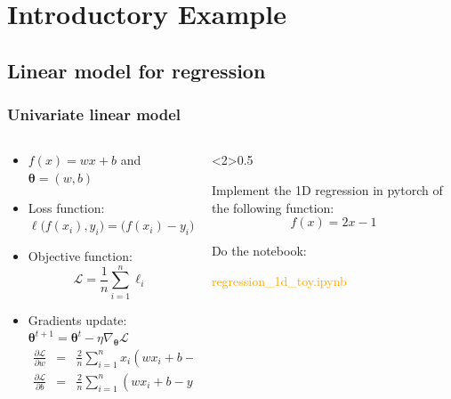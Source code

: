 \documentclass[pressentation,10pt,aspectratio=169,xcolor=table, colorlinks=true]{beamer}
\begin{document}
\section{Introductory Example}

\subsection{Linear model for regression}

\begin{frame}[fragile]
  \frametitle{Univariate linear model}
  \begin{columns}
    \begin{column}{0.5\linewidth}
      \begin{itemize}
      \item  \(f(x) = wx +b\)  and \(\boldsymbol{\theta} = (w,b)\)     
      \item Loss function: \(\ell \big(f(x_i),y_i\big) = \big(f(x_i) - y_i\big)^2\)
      \item Objective function: \[\mathcal{L} = \frac{1}{n} \sum_{i=1}^n \ell_i\]
      \item Gradients update: \(\boldsymbol{\theta}^{t+1} = \boldsymbol{\theta}^{t} - \eta\nabla_{\boldsymbol{\theta}}\mathcal{L}\)
        \begin{align*}
          \frac{\partial \mathcal{L}}{\partial w} & = & \frac{2}{n}\sum_{i=1}^n x_i(wx_i +b-y_i)\\
          \frac{\partial \mathcal{L}}{\partial b} & = & \frac{2}{n}\sum_{i=1}^n (wx_i +b-y_i)
        \end{align*}
      \end{itemize}
    \end{column}
    \begin{column}<2>{0.5\linewidth}
      \begin{work}
        Implement the 1D regression in pytorch of the following function:
        \[f(x)=2x-1\]

        Do the notebook:

        \begin{center}
          \textcolor{orange}{regression\_1d\_toy.ipynb}
        \end{center}
      \end{work}
    \end{column}
  \end{columns}
\end{frame}
\end{document}
